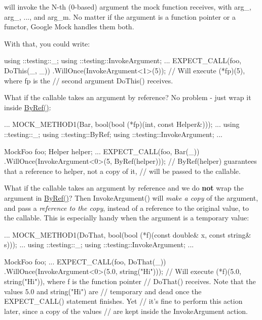 will invoke the {\ttfamily N}-\/th (0-\/based) argument the mock function receives, with {\ttfamily arg\+\_}, {\ttfamily arg\+\_}, ..., and {\ttfamily arg\+\_\+m}. No matter if the argument is a function pointer or a functor, Google Mock handles them both.

With that, you could write\+:


\begin{DoxyCode}
using ::testing::\_;
using ::testing::InvokeArgument;
...
  EXPECT\_CALL(foo, DoThis(\_, \_))
      .WillOnce(InvokeArgument<1>(5));
  // Will execute (*fp)(5), where fp is the
  // second argument DoThis() receives.
\end{DoxyCode}


What if the callable takes an argument by reference? No problem -\/ just wrap it inside {\ttfamily \hyperlink{namespacetesting_aaee6d42dcd69de6e7a1459c5c71222c3}{By\+Ref()}}\+:


\begin{DoxyCode}
...
  MOCK\_METHOD1(Bar, bool(bool (*fp)(int, const Helper&)));
...
using ::testing::\_;
using ::testing::ByRef;
using ::testing::InvokeArgument;
...

  MockFoo foo;
  Helper helper;
  ...
  EXPECT\_CALL(foo, Bar(\_))
      .WillOnce(InvokeArgument<0>(5, ByRef(helper)));
  // ByRef(helper) guarantees that a reference to helper, not a copy of it,
  // will be passed to the callable.
\end{DoxyCode}


What if the callable takes an argument by reference and we do {\bfseries not} wrap the argument in {\ttfamily \hyperlink{namespacetesting_aaee6d42dcd69de6e7a1459c5c71222c3}{By\+Ref()}}? Then {\ttfamily Invoke\+Argument()} will {\itshape make a copy} of the argument, and pass a {\itshape reference to the copy}, instead of a reference to the original value, to the callable. This is especially handy when the argument is a temporary value\+:


\begin{DoxyCode}
...
  MOCK\_METHOD1(DoThat, bool(bool (*f)(const double& x, const string& s)));
...
using ::testing::\_;
using ::testing::InvokeArgument;
...

  MockFoo foo;
  ...
  EXPECT\_CALL(foo, DoThat(\_))
      .WillOnce(InvokeArgument<0>(5.0, string("Hi")));
  // Will execute (*f)(5.0, string("Hi")), where f is the function pointer
  // DoThat() receives.  Note that the values 5.0 and string("Hi") are
  // temporary and dead once the EXPECT\_CALL() statement finishes.  Yet
  // it's fine to perform this action later, since a copy of the values
  // are kept inside the InvokeArgument action.
\end{DoxyCode}


